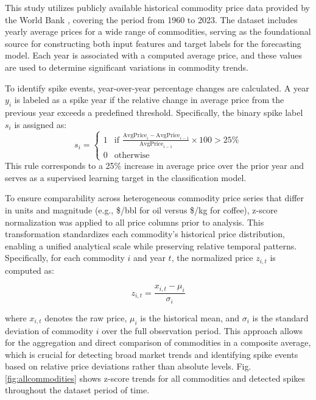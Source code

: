 \documentclass[12pt]{elsarticle}
\begin{document}
This study utilizes publicly available historical commodity price data provided by the World Bank \cite{worldbank2024commodities}, covering the period from 1960 to 2023. The dataset includes yearly average prices for a wide range of commodities, serving as the foundational source for constructing both input features and target labels for the forecasting model. Each year is associated with a computed average price, and these values are used to determine significant variations in commodity trends.

To identify spike events, year-over-year percentage changes are calculated. A year $y_i$ is labeled as a spike year if the relative change in average price from the previous year exceeds a predefined threshold. Specifically, the binary spike label $s_i$ is assigned as:
\begin{equation}
s_i =
\begin{cases}
1 & \text{if } \frac{\text{AvgPrice}_{i} - \text{AvgPrice}_{i-1}}{\text{AvgPrice}_{i-1}} \times 100 > 25\% \\
0 & \text{otherwise}
\end{cases}
\end{equation}
This rule corresponds to a 25\% increase in average price over the prior year and serves as a supervised learning target in the classification model.

To ensure comparability across heterogeneous commodity price series that differ in units and magnitude (e.g., \$/bbl for oil versus \$/kg for coffee), z-score normalization was applied to all price columns prior to analysis. This transformation standardizes each commodity’s historical price distribution, enabling a unified analytical scale while preserving relative temporal patterns. Specifically, for each commodity \( i \) and year \( t \), the normalized price \( z_{i,t} \) is computed as:

\begin{equation}
    z_{i,t} = \frac{x_{i,t} - \mu_i}{\sigma_i}
\end{equation}


where \( x_{i,t} \) denotes the raw price, \( \mu_i \) is the historical mean, and \( \sigma_i \) is the standard deviation of commodity \( i \) over the full observation period. This approach allows for the aggregation and direct comparison of commodities in a composite average, which is crucial for detecting broad market trends and identifying spike events based on relative price deviations rather than absolute levels.
Fig. \ref{fig:allcommodities} shows z-score trends for all commodities and detected spikes throughout the dataset period of time. 
\end{document}
